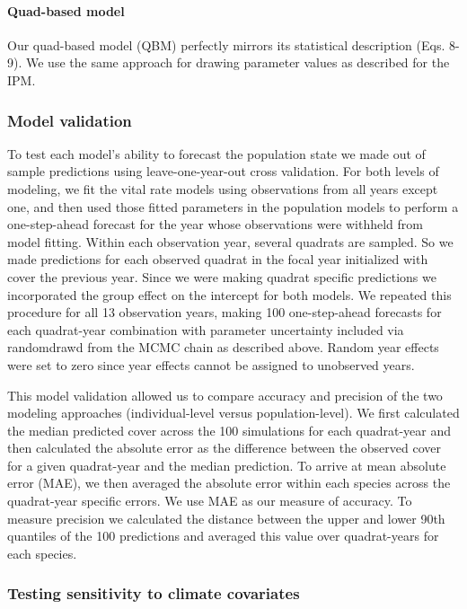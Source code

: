 \documentclass[12pt,]{article}
\begin{document}
\paragraph{Quad-based model}\label{quad-based-model}

Our quad-based model (QBM) perfectly mirrors its statistical description
(Eqs. 8-9). We use the same approach for drawing parameter values as
described for the IPM.

\subsubsection{Model validation}\label{model-validation}

To test each model's ability to forecast the population state we made
out of sample predictions using leave-one-year-out cross validation. For
both levels of modeling, we fit the vital rate models using observations
from all years except one, and then used those fitted parameters in the
population models to perform a one-step-ahead forecast for the year
whose observations were withheld from model fitting. Within each
observation year, several quadrats are sampled. So we made predictions
for each observed quadrat in the focal year initialized with cover the
previous year. Since we were making quadrat specific predictions we
incorporated the group effect on the intercept for both models. We
repeated this procedure for all 13 observation years, making 100
one-step-ahead forecasts for each quadrat-year combination with
parameter uncertainty included via randomdrawd from the MCMC chain as
described above. Random year effects were set to zero since year effects
cannot be assigned to unobserved years.

This model validation allowed us to compare accuracy and precision of
the two modeling approaches (individual-level versus population-level).
We first calculated the median predicted cover across the 100
simulations for each quadrat-year and then calculated the absolute error
as the difference between the observed cover for a given quadrat-year
and the median prediction. To arrive at mean absolute error (MAE), we
then averaged the absolute error within each species across the
quadrat-year specific errors. We use MAE as our measure of accuracy. To
measure precision we calculated the distance between the upper and lower
90th quantiles of the 100 predictions and averaged this value over
quadrat-years for each species.

\subsubsection{Testing sensitivity to climate
covariates}\label{testing-sensitivity-to-climate-covariates}
\end{document}
